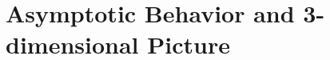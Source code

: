 \documentclass[12pt]{article}
\numberwithin{equation}{section}
\newcommand{\Li}{\mathrm{Li}_2}
\begin{document}





\section{Asymptotic Behavior and 3-dimensional Picture}
\label{sec:asymptotic}


\end{document}
